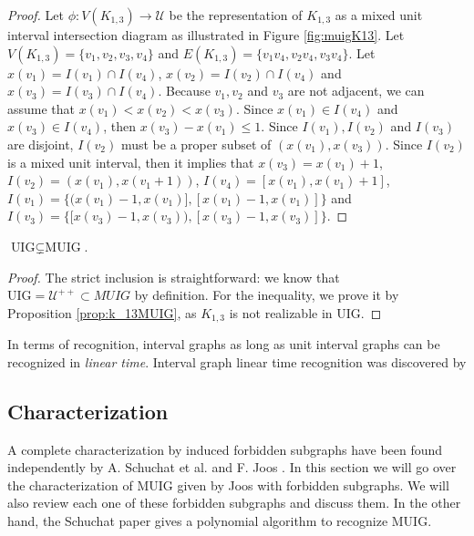 \begin{proof}
Let $\phi : V(K_{1,3}) \to \mathcal{U}$ be the representation of $K_{1,3}$ as a mixed unit interval intersection diagram as illustrated in Figure \ref{fig:muigK13}. Let $V(K_{1,3}) = \{v_1, v_2, v_3, v_4\}$ and $E(K_{1,3}) = \{v_1v_4, v_2v_4, v_3v_4\}$. Let $x(v_1) = I(v_1) \cap I(v_4)$, $x(v_2) = I(v_2) \cap I(v_4)$ and $x(v_3) = I(v_3) \cap I(v_4)$. Because $v_1, v_2$ and $v_3$ are not adjacent, we can assume that $x(v_1) < x(v_2) < x(v_3)$. Since $x(v_1) \in I(v_4)$ and $x(v_3) \in I(v_4)$, then $x(v_3) - x(v_1) \leqslant 1$. Since $I(v_1), I(v_2)$ and $I(v_3)$ are disjoint, $I(v_2)$ must be a proper subset of $(x(v_1), x(v_3))$. Since $I(v_2)$ is a mixed unit interval, then it implies that $x(v_3) = x(v_1) + 1$, $I(v_2) = (x(v_1), x(v_1+1))$, $I(v_4) = [x(v_1), x(v_1)+1]$, $I(v_1) = \{(x(v_1) -1, x(v_1)], [x(v_1) -1, x(v_1)]\}$ and $I(v_3) = \{[x(v_3) -1, x(v_3)), [x(v_3) -1, x(v_3)]\}$.
\end{proof}

\begin{theorem}
  $\text{UIG} \subsetneq \text{MUIG}$.
\end{theorem}

\begin{proof}
  The strict inclusion is straightforward: we know that $\text{UIG} = \mathcal{U}^{++} \subset MUIG$ by definition. For the inequality, we prove it by Proposition \ref{prop:k_13MUIG}, as $K_{1,3}$ is not realizable in UIG.
\end{proof}

In terms of recognition, interval graphs as long as unit interval graphs can be recognized in \emph{linear time}. Interval graph linear time recognition was discovered by

\subsection{Characterization}
\label{sec:muig_char}

A complete characterization by induced forbidden subgraphs have been found independently by A. Schuchat et al. \cite{shuchatUnitMixedInterval2014a} and F. Joos \cite{joosCharacterizationMixedUnit2013}. In this section we will go over the characterization of MUIG given by Joos with forbidden subgraphs. We will also review each one of these forbidden subgraphs and discuss them. In the other hand, the Schuchat paper gives a polynomial algorithm to recognize MUIG.

